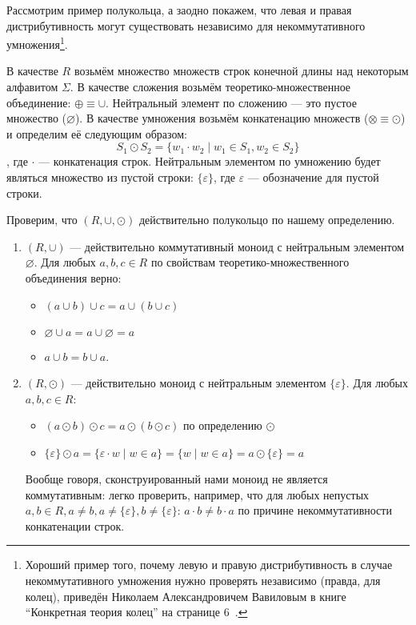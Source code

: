 \begin{example}\label{exmpl:semiring}
Рассмотрим пример полукольца, а заодно покажем, что левая и правая дистрибутивность могут существовать независимо для некоммутативного умножения\footnote{Хороший пример того, почему левую и правую дистрибутивность в случае некоммутативного умножения нужно проверять независимо (правда, для колец), приведён Николаем Александровичем Вавиловым в книге ``Конкретная теория колец'' на странице 6~\cite{VavilovRings}.}.

В качестве $R$ возьмём множество множеств строк конечной длины над некоторым алфавитом $\Sigma$. В качестве сложения возьмём теоретико-множественное объединение: $\oplus  \equiv \cup$. Нейтральный элемент по сложению --- это пустое множество ($\varnothing$).
В качестве умножения возьмём конкатенацию множеств ($\otimes  \equiv \odot$) и определим её следующим образом:
$$ S_1 \odot S_2 = \{ w_1 \cdot w_2 \mid w_1 \in S_1, w_2 \in S_2\}$$, где $\cdot$ --- конкатенация строк. Нейтральным элементом по умножению будет являться множество из пустой строки: $\{\varepsilon\}$, где $\varepsilon$ --- обозначение для пустой строки.

Проверим, что $(R, \cup, \odot)$ действительно полукольцо по нашему определению.

\begin{enumerate}

\item $(R, \cup)$ --- действительно коммутативный моноид с нейтральным элементом $\varnothing$. Для любых $a,b,c \in R$ по свойствам теоретико-множественного объединения верно:
\begin{itemize}
	\item $(a \cup b) \cup c = a \cup (b \cup c)$
	\item $\varnothing \cup a = a \cup \varnothing = a$
	\item $a \cup b = b \cup a$.
\end{itemize}

\item $(R, \odot)$ --- действительно моноид с нейтральным элементом $\{\varepsilon\}$. Для любых $a,b,c \in R$:
\begin{itemize}
	\item $(a \odot b) \odot c = a \odot (b \odot c)$ по определению $\odot$
    \item $\{\varepsilon\} \odot a = \{\varepsilon \cdot w \mid w \in a \} = \{w \mid w \in a \} = a \odot \{\varepsilon\} = a$
\end{itemize}
Вообще говоря, сконструированный нами моноид не является коммутативным: легко проверить, например, что для любых непустых $a,b \in R, a \neq b, a \neq \{\varepsilon\}, b \neq \{\varepsilon\}$: $a \cdot b \neq b \cdot a$ по причине некоммутативности конкатенации строк.


\end{enumerate}
\end{example}
